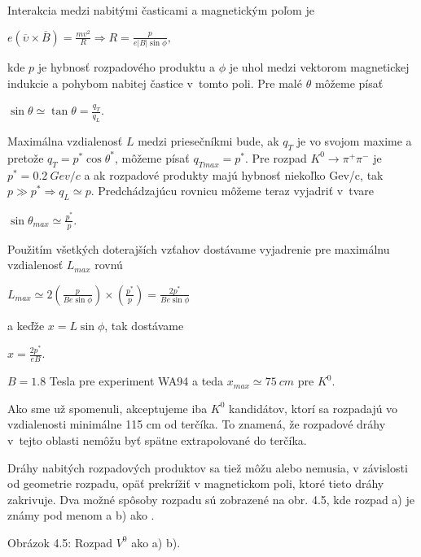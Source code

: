 Interakcia medzi nabitými časticami a magnetickým poľom je
\begin{center}
  $e(\overline{\upsilon} \times \overline{B}) = \frac{mv^{2}}{R} \Rightarrow
R=\frac{p}{e|B|\sin\phi},$
\end{center}
kde $p$ je hybnosť rozpadového produktu a $\phi$ je uhol medzi vektorom
magnetickej indukcie a pohybom nabitej častice v~tomto poli. Pre malé
$\theta$ môžeme písať
\begin{center}
  $\sin\theta \simeq \tan\theta = \frac{q_{T}}{q_{L}}$.
\end{center}
Maximálna vzdialenosť $L$ medzi priesečníkmi bude, ak $q_{T}$ je vo svojom
maxime a pretože $q_{T}=p^{*}\cos\theta^{*}$, môžeme písať $q_{Tmax}=p^{*}$.
Pre rozpad $K^{0}\longrightarrow \pi^{+} \pi^{-}$ je $p^{*}=0.2\: Gev/c$ a
ak rozpadové produkty majú hybnosť niekoľko Gev/c, tak  $p\gg p^{*}
\Rightarrow q_{L} \simeq p$. Predchádzajúcu rovnicu môžeme teraz vyjadriť 
v~tvare 
\begin{center}
  $\sin\theta_{max}\simeq\frac{p^{*}}{p}$.
\end{center}
Použitím všetkých doterajších vzťahov dostávame vyjadrenie pre maximálnu
vzdialenosť $L_{max}$ rovnú  
\begin{center}
  $L_{max}\simeq2(\frac{p}{Be\sin\phi})\times(\frac{p^{*}}{p}) =
\frac{2p^{*}}{Be\sin\phi}$
\end{center}
a keďže $x=L\sin\phi$, tak dostávame 
\begin{center}
  $x=\frac{2p^{*}}{eB}$.
\end{center}
$B = 1.8$ Tesla pre experiment WA94  a teda $x_{max}\simeq 75\: cm$  pre
$K^{0}$.

Ako sme už spomenuli, akceptujeme iba $K^{0}$ kandidátov, ktorí sa
rozpadajú vo vzdialenosti minimálne  115 cm od terčíka. To znamená, že
rozpadové dráhy v~tejto oblasti nemôžu byť spätne extrapolované do
terčíka. 

Dráhy  nabitých rozpadových produktov sa tiež môžu alebo nemusia, v
závislosti od geometrie rozpadu, opäť prekrížiť v magnetickom poli, ktoré
tieto dráhy zakrivuje. Dva možné spôsoby rozpadu sú zobrazené na obr. 4.5,
kde rozpad a) je známy pod menom  a b) ako .

\begin{center}
\hspace*{-2.5cm}

\end{center}
\vspace*{-8cm}
\begin{center}
  Obrázok 4.5: Rozpad $V^{0}$ ako a)  b).
\end{center}

